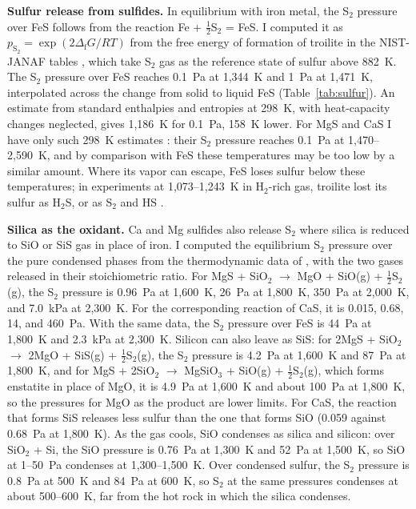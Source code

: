 \documentclass{planetary}
\begin{document}
\textbf{Sulfur release from sulfides.} In equilibrium with iron metal, the S$_2$ pressure over FeS follows from the reaction Fe + $\tfrac{1}{2}$S$_2$ = FeS. I computed it as $p_{\mathrm{S_2}} = \exp(2\Delta_{\mathrm{f}}G/RT)$ from the free energy of formation of troilite in the NIST-JANAF tables \parencite{janaf_fe025}, which take S$_2$ gas as the reference state of sulfur above 882~K. The S$_2$ pressure over FeS reaches 0.1~Pa at 1,344~K and 1~Pa at 1,471~K, interpolated across the change from solid to liquid FeS (Table~\ref{tab:sulfur}). An estimate from standard enthalpies and entropies at 298~K, with heat-capacity changes neglected, gives 1,186~K for 0.1~Pa, 158~K lower. For MgS and CaS I have only such 298~K estimates \parencite{lide2007}: their S$_2$ pressure reaches 0.1~Pa at 1,470--2,590~K, and by comparison with FeS these temperatures may be too low by a similar amount. Where its vapor can escape, FeS loses sulfur below these temperatures; in experiments at 1,073--1,243~K in H$_2$-rich gas, troilite lost its sulfur as H$_2$S, or as S$_2$ and HS \parencite{tachibana1998}.

\textbf{Silica as the oxidant.} Ca and Mg sulfides also release S$_2$ where silica is reduced to SiO or SiS gas in place of iron. I computed the equilibrium S$_2$ pressure over the pure condensed phases from the thermodynamic data of \textcite{mcbride2002}, with the two gases released in their stoichiometric ratio. For MgS + SiO$_2$ $\rightarrow$ MgO + SiO(g) + $\tfrac{1}{2}$S$_2$(g), the S$_2$ pressure is 0.96~Pa at 1,600~K, 26~Pa at 1,800~K, 350~Pa at 2,000~K, and 7.0~kPa at 2,300~K. For the corresponding reaction of CaS, it is 0.015, 0.68, 14, and 460~Pa. With the same data, the S$_2$ pressure over FeS is 44~Pa at 1,800~K and 2.3~kPa at 2,300~K. Silicon can also leave as SiS: for 2MgS + SiO$_2$ $\rightarrow$ 2MgO + SiS(g) + $\tfrac{1}{2}$S$_2$(g), the S$_2$ pressure is 4.2~Pa at 1,600~K and 87~Pa at 1,800~K, and for MgS + 2SiO$_2$ $\rightarrow$ MgSiO$_3$ + SiO(g) + $\tfrac{1}{2}$S$_2$(g), which forms enstatite in place of MgO, it is 4.9~Pa at 1,600~K and about 100~Pa at 1,800~K, so the pressures for MgO as the product are lower limits. For CaS, the reaction that forms SiS releases less sulfur than the one that forms SiO (0.059 against 0.68~Pa at 1,800~K). As the gas cools, SiO condenses as silica and silicon: over SiO$_2$ + Si, the SiO pressure is 0.76~Pa at 1,300~K and 52~Pa at 1,500~K, so SiO at 1--50~Pa condenses at 1,300--1,500~K. Over condensed sulfur, the S$_2$ pressure is 0.8~Pa at 500~K and 84~Pa at 600~K, so S$_2$ at the same pressures condenses at about 500--600~K, far from the hot rock in which the silica condenses.
\end{document}
